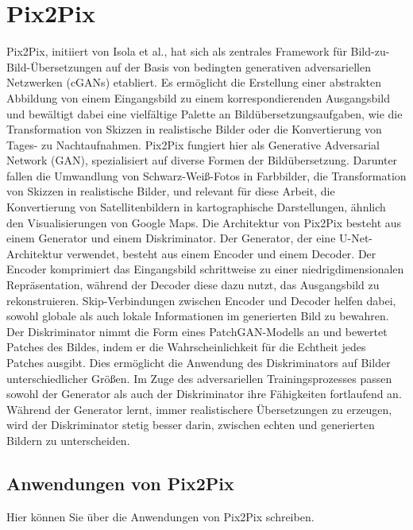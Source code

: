 \section{Pix2Pix}
Pix2Pix, initiiert von Isola et al., hat sich als zentrales Framework für Bild-zu-Bild-Übersetzungen auf der Basis von bedingten generativen adversariellen Netzwerken (cGANs) etabliert. Es ermöglicht die Erstellung einer abstrakten Abbildung von einem Eingangsbild zu einem korrespondierenden Ausgangsbild und bewältigt dabei eine vielfältige Palette an Bildübersetzungsaufgaben, wie die Transformation von Skizzen in realistische Bilder oder die Konvertierung von Tages- zu Nachtaufnahmen. \newline
Pix2Pix fungiert hier als Generative Adversarial Network (GAN), spezialisiert auf diverse Formen der Bildübersetzung. Darunter fallen die Umwandlung von Schwarz-Weiß-Fotos in Farbbilder, die Transformation von Skizzen in realistische Bilder, und relevant für diese Arbeit, die Konvertierung von Satellitenbildern in kartographische Darstellungen, ähnlich den Visualisierungen von Google Maps. \newline	Die Architektur von Pix2Pix besteht aus einem Generator und einem Diskriminator. Der Generator, der eine U-Net-Architektur verwendet, besteht aus einem Encoder und einem Decoder. Der Encoder komprimiert das Eingangsbild schrittweise zu einer niedrigdimensionalen Repräsentation, während der Decoder diese dazu nutzt, das Ausgangsbild zu rekonstruieren. Skip-Verbindungen zwischen Encoder und Decoder helfen dabei, sowohl globale als auch lokale Informationen im generierten Bild zu bewahren. \newline
Der Diskriminator nimmt die Form eines PatchGAN-Modells an und bewertet Patches des Bildes, indem er die Wahrscheinlichkeit für die Echtheit jedes Patches ausgibt. Dies ermöglicht die Anwendung des Diskriminators auf Bilder unterschiedlicher Größen. Im Zuge des adversariellen Trainingsprozesses passen sowohl der Generator als auch der Diskriminator ihre Fähigkeiten fortlaufend an. Während der Generator lernt, immer realistischere Übersetzungen zu erzeugen, wird der Diskriminator stetig besser darin, zwischen echten und generierten Bildern zu unterscheiden.
  



\subsection{Anwendungen von Pix2Pix}
Hier können Sie über die Anwendungen von Pix2Pix schreiben.
